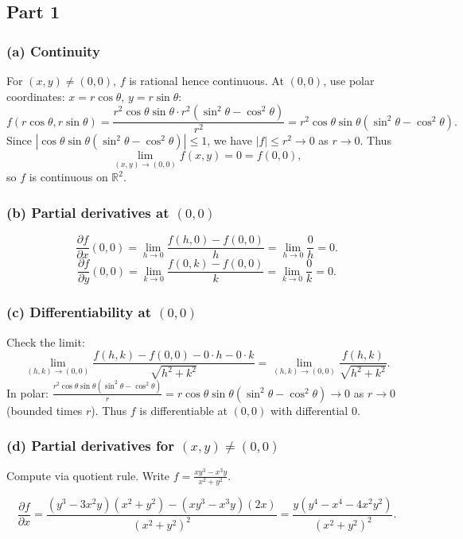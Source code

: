 \documentclass[12pt]{article}
\begin{document}
\begin{answerbox}
\subsection*{Part 1}

\subsubsection*{(a) Continuity}
For \((x,y)\neq(0,0)\), \(f\) is rational hence continuous. At \((0,0)\), use polar coordinates: \(x=r\cos\theta\), \(y=r\sin\theta\):
\[
f(r\cos\theta,r\sin\theta) = \frac{r^2\cos\theta\sin\theta \cdot r^2(\sin^2\theta-\cos^2\theta)}{r^2} = r^2\cos\theta\sin\theta(\sin^2\theta-\cos^2\theta).
\]
Since \(|\cos\theta\sin\theta(\sin^2\theta-\cos^2\theta)|\leq 1\), we have \(|f|\leq r^2\to0\) as \(r\to0\). Thus
\[
\lim_{(x,y)\to(0,0)} f(x,y)=0=f(0,0),
\]
so \(f\) is continuous on \(\mathbb{R}^2\).

\subsubsection*{(b) Partial derivatives at \((0,0)\)}
\[
\frac{\partial f}{\partial x}(0,0)=\lim_{h\to0}\frac{f(h,0)-f(0,0)}{h}=\lim_{h\to0}\frac{0}{h}=0.
\]
\[
\frac{\partial f}{\partial y}(0,0)=\lim_{k\to0}\frac{f(0,k)-f(0,0)}{k}=\lim_{k\to0}\frac{0}{k}=0.
\]

\subsubsection*{(c) Differentiability at \((0,0)\)}
Check the limit:
\[
\lim_{(h,k)\to(0,0)}\frac{f(h,k)-f(0,0)-0\cdot h-0\cdot k}{\sqrt{h^2+k^2}} = \lim_{(h,k)\to(0,0)}\frac{f(h,k)}{\sqrt{h^2+k^2}}.
\]
In polar: \(\frac{r^2\cos\theta\sin\theta(\sin^2\theta-\cos^2\theta)}{r}=r\cos\theta\sin\theta(\sin^2\theta-\cos^2\theta)\to0\) as \(r\to0\) (bounded times \(r\)). Thus \(f\) is differentiable at \((0,0)\) with differential 0.

\subsubsection*{(d) Partial derivatives for \((x,y)\neq(0,0)\)}
Compute via quotient rule. Write \(f=\frac{xy^3-x^3y}{x^2+y^2}\).

\[
\frac{\partial f}{\partial x}= \frac{(y^3-3x^2y)(x^2+y^2) - (xy^3-x^3y)(2x)}{(x^2+y^2)^2}
= \frac{y(y^4 - x^4 - 4x^2y^2)}{(x^2+y^2)^2}.
\]


\end{answerbox}
\end{document}
